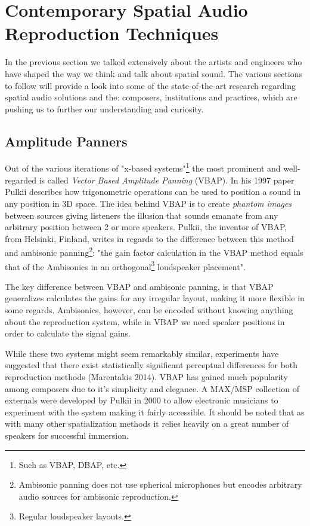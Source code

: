 \section{Contemporary Spatial Audio Reproduction Techniques} \label{sec:contemp_audio_reproduction}

In the previous section we talked extensively about the artists and engineers who have shaped the way we think and talk about spatial sound. The various sections to follow will provide a look into some of the state-of-the-art research regarding spatial audio solutions and the: composers, institutions and practices, which are pushing us to further our understanding and curiosity. 

\subsection{Amplitude Panners}
\label{subsec:amplitude panner}


Out of the various iterations of "x-based systems"\footnote{Such as VBAP, DBAP, etc.} the most prominent and well-regarded is called \textit{Vector Based Amplitude Panning} (VBAP). In his 1997 paper \cite{pulkki1997virtual} Pulkii describes how trigonometric operations can be used to position a sound in any position in 3D space. The idea behind VBAP is to create \textit{phantom images} between sources giving listeners the illusion that sounds emanate from any arbitrary position between 2 or more speakers. Pulkii, the inventor of VBAP, from Helsinki, Finland, writes in regards to the difference between this method and ambisonic panning\footnote{Ambisonic panning does not use spherical microphones but encodes arbitrary audio sources for ambisonic reproduction.}: "the gain factor calculation in the VBAP method equals that of the Ambisonics in an orthogonal\footnote{Regular loudspeaker layouts.} loudspeaker placement". 

The key difference between VBAP and ambisonic panning, is that VBAP generalizes calculates the gains for any irregular layout, making it more flexible in some regards. Ambisonics, however, can be encoded without knowing anything about the reproduction system, while in VBAP we need speaker positions in order to calculate the signal gains. 

While these two systems might seem remarkably similar, experiments have suggested that there exist statistically significant perceptual differences for both reproduction methods (Marentakis 2014). VBAP has gained much popularity among composers due to it's simplicity and elegance. A MAX/MSP collection of externals were developed by Pulkii in 2000 to allow electronic musicians to experiment with the system making it fairly accessible. It should be noted that as with many other spatialization methods it relies heavily on a great number of speakers for successful immersion. 

